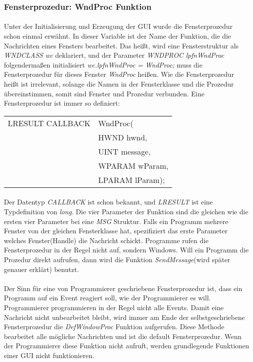 \subsubsection{Fensterprozedur: WndProc Funktion}
\paragraph{}
Unter der Initialisierung und Erzeugung der GUI wurde die Fensterprozedur schon einmal erwähnt. In dieser Variable ist der Name der Funktion, die die Nachrichten eines Fensters bearbeitet. Das heißt, wird eine Fensterstruktur als \textit{WNDCLASS wc} deklariert, und der Parameter \textit{WNDPROC lpfnWndProc} folgendermaßen initialisiert \textit{wc.lpfnWndProc = WndProc;} muss die Fensterprozedur für dieses Fenster \textit{WndProc} heißen. Wie die Fensterprozedur heißt ist irrelevant, solange die Namen in der Fensterklasse und die Prozedur übereinstimmen, somit sind Fenster und Prozedur verbunden. Eine Fensterprozedur ist immer so definiert:

\begin{tabular}{ll}
LRESULT CALLBACK & WndProc(\\
& HWND hwnd,\\
& UINT message,\\
& WPARAM wParam,\\
& LPARAM lParam);
\end{tabular}



\paragraph{}
Der Datentyp \textit{CALLBACK} ist schon bekannt, und \textit{LRESULT} ist eine Typdefinition von \textit{long}. Die vier Parameter der Funktion sind die gleichen wie die ersten vier Parameter bei eine \textit{MSG} Struktur. Falls ein Programm mehrere Fenster von der gleichen Fensterklasse hat, spezifiziert das erste Parameter welches Fenster(Handle) die Nachricht schickt. Programme rufen die Fensterprozedur in der Regel nicht auf, sondern Windows. Will ein Programm die Prozedur direkt aufrufen, dann wird die Funktion \textit{SendMessage}(wird später genauer erklärt) benutzt. 

\paragraph{}
Der Sinn für eine von Programmierer geschriebene Fensterprozedur ist, dass ein Programm auf ein Event reagiert soll, wie der Programmierer es will. Programmierer programmieren in der Regel nicht alle Events. Damit eine Nachricht nicht unbearbeitet bleibt, wird immer am Ende der selbstgeschriebene Fensterprozedur die \textit{DefWindowProc} Funktion aufgerufen. Diese Methode bearbeitet alle mögliche Nachrichten und ist die default Fensterprozedur. Wenn der Programmierer diese Funktion nicht aufruft, werden grundlegende Funktionen einer GUI nicht funktionieren.

